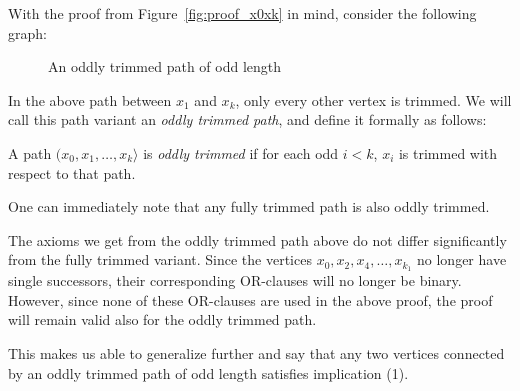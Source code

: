 With the proof from Figure~\ref{fig:proof_x0xk} in mind, consider the following graph:\par
\begin{figure}[!h]
  \centering
  \caption{An oddly trimmed path of odd length}
  \label{fig:oddly_trimmed_path}
\end{figure}
\FloatBarrier
In the above path between $x_1$ and $x_k$, only every other vertex is trimmed.
We will call this path variant an \textit{oddly trimmed path}, and define it formally as follows:
\begin{definition}
  A path $(x_0, x_1, \dots , x_k\rangle$ is \textit{oddly trimmed} if for each odd $i < k$, $x_i$ is trimmed with respect to that path.
\end{definition}
One can immediately note that any fully trimmed path is also oddly trimmed.

The axioms we get from the oddly trimmed path above do not differ significantly from the fully trimmed variant.
Since the vertices $x_0, x_2, x_4, \dots ,x_{k_1}$ no longer have single successors, their corresponding OR-clauses will no longer be binary.
However, since none of these OR-clauses are used in the above proof, the proof will remain valid also for the oddly trimmed path.

This makes us able to generalize further and say that any two vertices connected by an oddly trimmed path of odd length satisfies implication (1).
